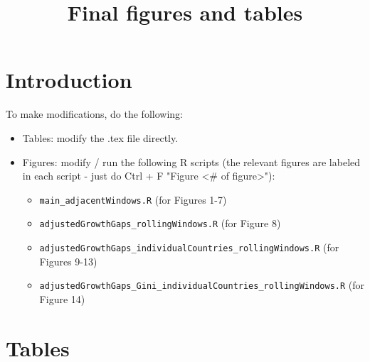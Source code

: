 \documentclass[12pt,english]{article}
\theoremstyle{remark}
\begin{document}
\title{Final figures and tables}
\maketitle



\section{Introduction}

To make modifications, do the following:

\begin{itemize}
	\item Tables: modify the .tex file directly.
	\item Figures: modify / run the following R scripts (the relevant figures are labeled in each script - just do Ctrl + F "Figure <\# of figure>"):
	\begin{itemize}
		\item {\tt main\_adjacentWindows.R} (for Figures 1-7)
		\item {\tt adjustedGrowthGaps\_rollingWindows.R} (for Figure 8) 
		\item {\tt adjustedGrowthGaps\_individualCountries\_rollingWindows.R} (for Figures 9-13)
		\item {\tt adjustedGrowthGaps\_Gini\_individualCountries\_rollingWindows.R} (for Figure 14)
	\end{itemize}
\end{itemize}



\section{Tables}
















\end{document}
